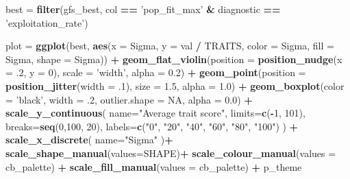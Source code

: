 \documentclass[]{book}
\newenvironment{Shaded}{\begin{snugshade}}{\end{snugshade}}
\newcommand{\DataTypeTok}[1]{\textcolor[rgb]{0.13,0.29,0.53}{#1}}
\newcommand{\DecValTok}[1]{\textcolor[rgb]{0.00,0.00,0.81}{#1}}
\newcommand{\FloatTok}[1]{\textcolor[rgb]{0.00,0.00,0.81}{#1}}
\newcommand{\KeywordTok}[1]{\textcolor[rgb]{0.13,0.29,0.53}{\textbf{#1}}}
\newcommand{\NormalTok}[1]{#1}
\newcommand{\OperatorTok}[1]{\textcolor[rgb]{0.81,0.36,0.00}{\textbf{#1}}}
\newcommand{\OtherTok}[1]{\textcolor[rgb]{0.56,0.35,0.01}{#1}}
\newcommand{\StringTok}[1]{\textcolor[rgb]{0.31,0.60,0.02}{#1}}
\begin{document}
\begin{Shaded}
\begin{Highlighting}[]
\NormalTok{best =}\StringTok{ }\KeywordTok{filter}\NormalTok{(gfs_best, col }\OperatorTok{==}\StringTok{ 'pop_fit_max'} \OperatorTok{&}\StringTok{ }\NormalTok{diagnostic }\OperatorTok{==}\StringTok{ 'exploitation_rate'}\NormalTok{)}

\NormalTok{plot =}\StringTok{ }\KeywordTok{ggplot}\NormalTok{(best, }\KeywordTok{aes}\NormalTok{(}\DataTypeTok{x =}\NormalTok{ Sigma, }\DataTypeTok{y =}\NormalTok{ val }\OperatorTok{/}\StringTok{ }\NormalTok{TRAITS, }\DataTypeTok{color =}\NormalTok{ Sigma, }\DataTypeTok{fill =}\NormalTok{ Sigma, }\DataTypeTok{shape =}\NormalTok{ Sigma)) }\OperatorTok{+}
\StringTok{  }\KeywordTok{geom_flat_violin}\NormalTok{(}\DataTypeTok{position =} \KeywordTok{position_nudge}\NormalTok{(}\DataTypeTok{x =} \FloatTok{.2}\NormalTok{, }\DataTypeTok{y =} \DecValTok{0}\NormalTok{), }\DataTypeTok{scale =} \StringTok{'width'}\NormalTok{, }\DataTypeTok{alpha =} \FloatTok{0.2}\NormalTok{) }\OperatorTok{+}
\StringTok{  }\KeywordTok{geom_point}\NormalTok{(}\DataTypeTok{position =} \KeywordTok{position_jitter}\NormalTok{(}\DataTypeTok{width =} \FloatTok{.1}\NormalTok{), }\DataTypeTok{size =} \FloatTok{1.5}\NormalTok{, }\DataTypeTok{alpha =} \FloatTok{1.0}\NormalTok{) }\OperatorTok{+}
\StringTok{  }\KeywordTok{geom_boxplot}\NormalTok{(}\DataTypeTok{color =} \StringTok{'black'}\NormalTok{, }\DataTypeTok{width =} \FloatTok{.2}\NormalTok{, }\DataTypeTok{outlier.shape =} \OtherTok{NA}\NormalTok{, }\DataTypeTok{alpha =} \FloatTok{0.0}\NormalTok{) }\OperatorTok{+}
\StringTok{  }\KeywordTok{scale_y_continuous}\NormalTok{(}
    \DataTypeTok{name=}\StringTok{"Average trait score"}\NormalTok{,}
    \DataTypeTok{limits=}\KeywordTok{c}\NormalTok{(}\OperatorTok{-}\DecValTok{1}\NormalTok{, }\DecValTok{101}\NormalTok{),}
    \DataTypeTok{breaks=}\KeywordTok{seq}\NormalTok{(}\DecValTok{0}\NormalTok{,}\DecValTok{100}\NormalTok{, }\DecValTok{20}\NormalTok{),}
    \DataTypeTok{labels=}\KeywordTok{c}\NormalTok{(}\StringTok{"0"}\NormalTok{, }\StringTok{"20"}\NormalTok{, }\StringTok{"40"}\NormalTok{, }\StringTok{"60"}\NormalTok{, }\StringTok{"80"}\NormalTok{, }\StringTok{"100"}\NormalTok{)}
\NormalTok{  ) }\OperatorTok{+}
\StringTok{  }\KeywordTok{scale_x_discrete}\NormalTok{(}
    \DataTypeTok{name=}\StringTok{"Sigma"}
\NormalTok{  )}\OperatorTok{+}
\StringTok{  }\KeywordTok{scale_shape_manual}\NormalTok{(}\DataTypeTok{values=}\NormalTok{SHAPE)}\OperatorTok{+}
\StringTok{  }\KeywordTok{scale_colour_manual}\NormalTok{(}\DataTypeTok{values =}\NormalTok{ cb_palette) }\OperatorTok{+}
\StringTok{  }\KeywordTok{scale_fill_manual}\NormalTok{(}\DataTypeTok{values =}\NormalTok{ cb_palette) }\OperatorTok{+}
\StringTok{  }\NormalTok{p_theme}


\end{Highlighting}
\end{Shaded}
\end{document}
